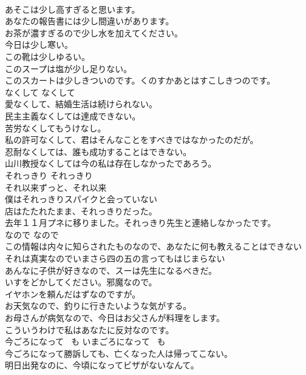 \documentclass[8pt]{extreport}
\begin{document}
\begin{CJK}{UTF8}{min}
\\	あそこは少し高すぎると思います。  
\\	あなたの報告書には少し間違いがあります。
\\	お茶が濃すぎるので少し水を加えてください。
\\	今日は少し寒い。
\\	この靴は少しゆるい。
\\	このスープは塩が少し足りない。  
\\	このスカートは少しきついのです。くのすかあとはすこしきつのです。
\\	なくして	なくして	
\\	愛なくして、結婚生活は続けられない。   
\\	民主主義なくしては達成できない。  
\\	苦労なくしてもうけなし。  
\\	私の許可なくして、君はそんなことをすべきではなかったのだが。  
\\	忍耐なくしては、誰も成功することはできない。  
\\	山川教授なくしては今の私は存在しなかったであろう。   
\\	それっきり	それっきり	
\\	それ以来ずっと、それ以来	
\\	僕はそれっきりスパイクと会っていない  
\\	店はたたれたまま、それっきりだった。   
\\	去年１１月プネに移りました。それっきり先生と連絡しなかったです。  
\\	なので	なので	
\\	この情報は内々に知らされたものなので、あなたに何も教えることはできない  
\\	それは真実なのでいまさら四の五の言ってもはじまらない  
\\	あんなに子供が好きなので、スーは先生になるべきだ。   
\\	いすをどかしてください。邪魔なので。   
\\	イヤホンを頼んだはずなのですが。   
\\	お天気なので、釣りに行きたいような気がする。   
\\	お母さんが病気なので、今日はお父さんが料理をします。   
\\	こういうわけで私はあなたに反対なのです。  
\\	今ごろになって ~も	いまごろになって ~も	
\\	今ごろになって勝訴しても、亡くなった人は帰ってこない。  
\\	明日出発なのに、今頃になってビザがないなんて。  

\end{CJK}
\end{document}
